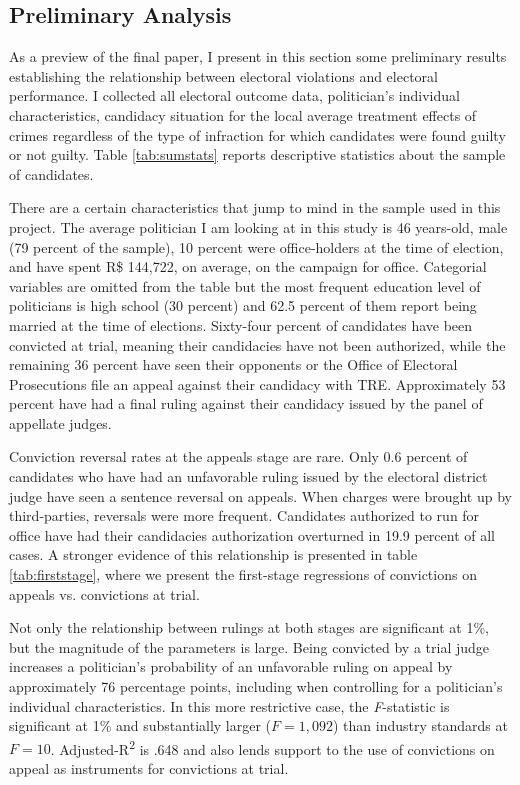 \documentclass[11pt]{article}
\begin{document}
\subsection{Preliminary Analysis} \label{subsec:results_paper1}

As a preview of the final paper, I present in this section some preliminary results establishing the relationship between electoral violations and electoral performance. I collected all electoral outcome data, politician's individual characteristics, candidacy situation for the local average treatment effects of crimes regardless of the type of infraction for which candidates were found guilty or not guilty. Table \ref{tab:sumstats} reports descriptive statistics about the sample of candidates.



There are a certain characteristics that jump to mind in the sample used in this project. The average politician I am looking at in this study is 46 years-old, male (79 percent of the sample), 10 percent were office-holders at the time of election, and have spent R\$ 144,722, on average, on the campaign for office. Categorial variables are omitted from the table but the most frequent education level of politicians is high school (30 percent) and 62.5 percent of them report being married at the time of elections. Sixty-four percent of candidates have been convicted at trial, meaning their candidacies have not been authorized, while the remaining 36 percent have seen their opponents or the Office of Electoral Prosecutions file an appeal against their candidacy with TRE. Approximately 53 percent have had a final ruling against their candidacy issued by the panel of appellate judges.

Conviction reversal rates at the appeals stage are rare. Only 0.6 percent of candidates who have had an unfavorable ruling issued by the electoral district judge have seen a sentence reversal on appeals. When charges were brought up by third-parties, reversals were more frequent. Candidates authorized to run for office have had their candidacies authorization overturned in 19.9 percent of all cases. A stronger evidence of this relationship is presented in table \ref{tab:firststage}, where we present the first-stage regressions of convictions on appeals vs. convictions at trial.



Not only the relationship between rulings at both stages are significant at 1\%, but the magnitude of the parameters is large. Being convicted by a trial judge increases a politician's probability of an unfavorable ruling on appeal by approximately 76 percentage points, including when controlling for a politician's individual characteristics. In this more restrictive case, the \emph{F}-statistic is significant at 1\% and substantially larger ($F = 1{,}092$) than industry standards at $F = 10$. Adjusted-R\textsuperscript{2} is .648 and also lends support to the use of convictions on appeal as instruments for convictions at trial.
\end{document}
